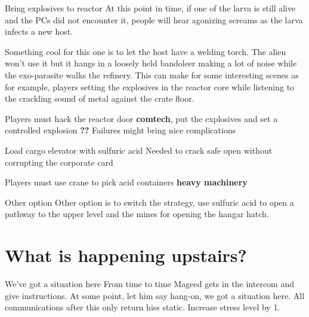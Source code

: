  
 \begin{rpg-commentbox}{Bring explosives to reactor}
    At this point in time, if one of the larva is still alive and the PCs did not encounter it, people will hear agonizing screams as the larva infects a new host. 

    Something cool for this one is to let the host have a welding torch. The alien won't use it but it hangs in a loosely held bandoleer making a lot of noise while the exo-parasite walks the refinery. This can make for some interesting scenes as for example, players setting the explosives in the reactor core while listening to the crackling sound of metal against the crate floor.

    Players must hack the reactor door \textbf{comtech}, put the explosives and set a controlled explosion \textbf{??} Failures might bring nice complications
 \end{rpg-commentbox}

 \begin{rpg-commentbox}{Load cargo elevator with sulfuric acid}
    Needed to crack safe open without corrupting the corporate card

    Players must use crane to pick acid containers \textbf{heavy machinery}
 \end{rpg-commentbox}


 \begin{rpg-commentbox}{Other option}
   Other option is to switch the strategy, use sulfuric acid to open a pathway to the upper level and the mines for opening the hangar hatch.
\end{rpg-commentbox}

 \newsect

 \section{What is happening upstairs?}
 
\begin{rpg-commentbox}{We've got a situation here}
   From time to time Mageed gets in the intercom and give instructions. At some point, let him say hang-on, we got a situation here. All communications after this only return hiss static. Increase stress level by 1.
\end{rpg-commentbox}
